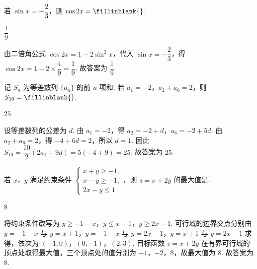 \begin{problem}
若 \(\sin x=-\dfrac{2}{3}\)，则 \(\cos 2x=\fillinblank{}\).
\end{problem}

\begin{answer}
\(\dfrac{1}{9}\)
\end{answer}

\begin{solution}
由二倍角公式 \(\cos2x=1-2\sin^2x\)，代入 \(\sin x=-\dfrac23\)，得 \(\cos2x=1-2\times\dfrac49=\dfrac19\). 故答案为 \(\dfrac19\).
\end{solution}

\begin{problem}
记 \(S_n\) 为等差数列 \(\{a_n\}\) 的前 \(n\) 项和. 若 \(a_1=-2\)，\(a_2+a_6=2\)，则 \(S_{10}=\fillinblank{}\).
\end{problem}

\begin{answer}
\(25\)
\end{answer}

\begin{solution}
设等差数列的公差为 \(d\). 由 \(a_1=-2\)，得 \(a_2=-2+d\)，\(a_6=-2+5d\). 由 \(a_2+a_6=2\)，得 \(-4+6d=2\)，所以 \(d=1\). 因此 \(S_{10}=\dfrac{10}{2}\left(2a_1+9d\right)=5(-4+9)=25\). 故答案为 \(25\).
\end{solution}

\begin{problem}
若 \(x\)，\(y\) 满足约束条件
\(\begin{cases}
x+y\ge -1,\\
x-y\ge -1,\\
2x-y\le 1
\end{cases}\)，则 \(z=x+2y\) 的最大值是\fillinblank{}.
\end{problem}

\begin{answer}
\(8\)
\end{answer}

\begin{solution}
将约束条件改写为 \(y\geq-1-x\)，\(y\leq x+1\)，\(y\geq2x-1\). 可行域的边界交点分别由
\(y=-1-x\) 与 \(y=x+1\)，\(y=-1-x\) 与 \(y=2x-1\)，\(y=x+1\) 与 \(y=2x-1\) 求得，依次为 \((-1,0)\)，\((0,-1)\)，\((2,3)\). 目标函数 \(z=x+2y\) 在有界可行域的顶点处取得最大值，三个顶点处的值分别为 \(-1\)，\(-2\)，\(8\)，故最大值为 \(8\). 故答案为 \(8\).
\end{solution}

